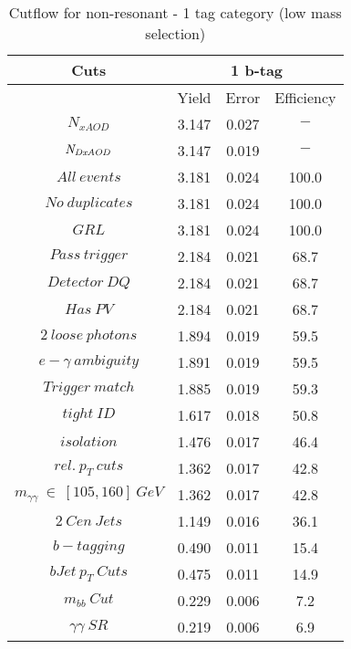 \begin{table}\footnotesize
\begin{center} 
\caption{Cutflow for non-resonant \hhyybb - 1 tag category (low mass selection)}
\label{tab:cutflow-nonres-1tag-low}
\begin{tabular}{|c|c|c|c|} 
 \hline 
Cuts& \multicolumn{3}{c|}{1 b-tag} \\ \hline 
 &Yield&Error&Efficiency\\ \hline 
$N_{xAOD}$ & 3.147&0.027 &$-$ \\ 
 \hline 
$\it{N}_{DxAOD}$ & 3.147&0.019 &$-$ \\ 
 \hline 
$All\ events$ & 3.181&0.024 &100.0 \\ 
 \hline 
$No\ duplicates$ & 3.181&0.024 &100.0 \\ 
 \hline 
$GRL$ & 3.181&0.024 &100.0 \\ 
 \hline 
$Pass\ trigger$ & 2.184&0.021 &68.7 \\ 
 \hline 
$Detector\ DQ$ & 2.184&0.021 &68.7 \\ 
 \hline 
$Has\ PV$ & 2.184&0.021 &68.7 \\ 
 \hline 
$2\ loose\ photons$ & 1.894&0.019 &59.5 \\ 
 \hline 
$e-\gamma\ ambiguity$ & 1.891&0.019 &59.5 \\ 
 \hline 
$Trigger\ match$ & 1.885&0.019 &59.3 \\ 
 \hline 
$tight\ ID$ & 1.617&0.018 &50.8 \\ 
 \hline 
$isolation$ & 1.476&0.017 &46.4 \\ 
 \hline 
$rel.\ p_{T}\ cuts$ & 1.362&0.017 &42.8 \\ 
 \hline 
$m_{\gamma\gamma}\ \in\ [105,160]\ GeV$ & 1.362&0.017 &42.8 \\ 
 \hline 
$2\ Cen\ Jets$ & 1.149&0.016 &36.1 \\ 
 \hline 
$b-tagging$ & 0.490&0.011 &15.4 \\ 
 \hline 
$bJet\ p_{T}\ Cuts$ & 0.475&0.011 &14.9 \\ 
 \hline 
$m_{bb}\ Cut$ & 0.229&0.006 & 7.2 \\ 
 \hline 
$\gamma\gamma\ SR$ & 0.219&0.006 & 6.9 \\ 
 \hline 
\end{tabular}
\end{center}
\end{table}

